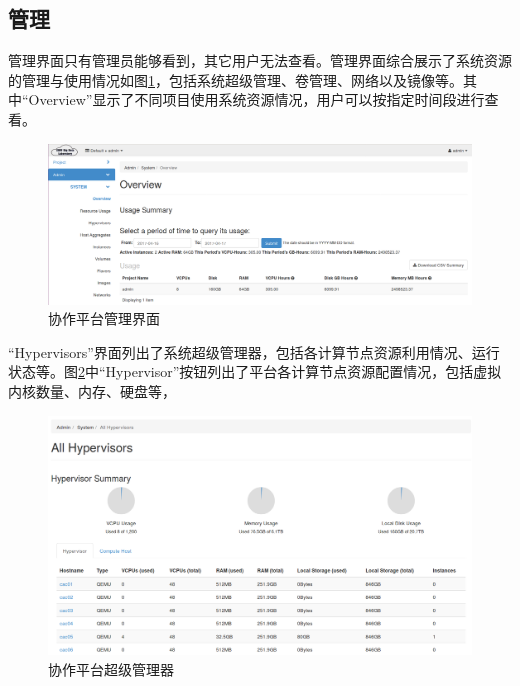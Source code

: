 \documentclass[12pt]{article}
\begin{document}
\subsection{管理}
管理界面只有管理员能够看到，其它用户无法查看。管理界面综合展示了系统资源的管理与使用情况如图\ref{fig:adminsystemoverview}，包括系统超级管理、卷管理、网络以及镜像等。其中``Overview''显示了不同项目使用系统资源情况，用户可以按指定时间段进行查看。
\begin{figure}[!htb]
\centering
\includegraphics[width=6in]{./figures/Admin_System_Overview}
\caption{协作平台管理界面}
\label{fig:adminsystemoverview}
\end{figure}

``Hypervisors''界面列出了系统超级管理器，包括各计算节点资源利用情况、运行状态等。图\ref{fig:adminsystemhypervisors}中``Hypervisor''按钮列出了平台各计算节点资源配置情况，包括虚拟内核数量、内存、硬盘等，
\begin{figure}[!htb]
\centering
\includegraphics[width=6in]{./figures/Admin_System_Hypervisors}
\caption{协作平台超级管理器}
\label{fig:adminsystemhypervisors}
\end{figure}
\end{document}
